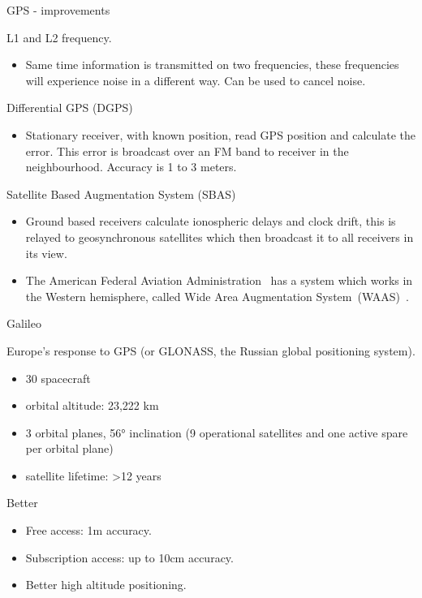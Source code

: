 \documentclass[compress]{beamer}
\begin{document}
\begin{frame}{GPS - improvements}

L1 and L2 frequency.

\begin{itemize}

\item
  Same time information is transmitted on two frequencies, these
  frequencies will experience noise in a different way. Can be used to
  cancel noise.
\end{itemize}

Differential GPS (DGPS)

\begin{itemize}

\item
  Stationary receiver, with known position, read GPS position and
  calculate the error. This error is broadcast over an FM band to
  receiver in the neighbourhood. Accuracy is 1 to 3 meters.
\end{itemize}

Satellite Based Augmentation System (SBAS)

\begin{itemize}

\item
  Ground based receivers calculate ionospheric delays and clock drift,
  this is relayed to geosynchronous satellites which then broadcast it
  to all receivers in its view.
\item
  The American Federal Aviation Administration~ has a system which works
  in the Western hemisphere, called Wide Area Augmentation
  System~(WAAS)~.
\end{itemize}

\end{frame}

\begin{frame}{Galileo}

Europe's response to GPS (or GLONASS, the Russian global positioning
system).

\begin{itemize}

\item
  30 spacecraft
\item
  orbital altitude: 23,222 km
\item
  3 orbital planes, 56° inclination (9 operational satellites and one
  active spare per orbital plane)
\item
  satellite lifetime: \textgreater{}12 years
\end{itemize}

Better

\begin{itemize}

\item
  Free access: 1m accuracy.
\item
  Subscription access: up to 10cm accuracy.
\item
  Better high altitude positioning.
\end{itemize}

\end{frame}
\end{document}
